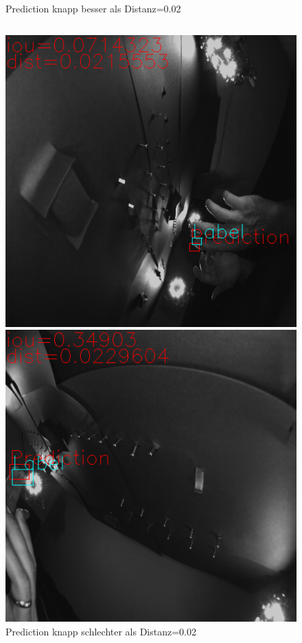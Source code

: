 \documentclass[a4paper,12pt]{article}
\begin{document}
\begin{figure}
\begin{minipage}[b]{0.48\textwidth}
	\end{minipage}
	\caption{Prediction knapp besser als Distanz=0.02}
	\label{img:distanz_knapp_gut}
	\begin{verbatim}
	\end{verbatim}
	\centering
	\begin{minipage}[b]{0.48\textwidth}	
		\includegraphics[width=\textwidth]{BilderResultate/3distKnappSchlecht.png}
	\end{minipage}
	\hfill
	\begin{minipage}[b]{0.48\textwidth}		
		\includegraphics[width=\textwidth]{BilderResultate/4distKnappSchlecht.png}
	\end{minipage}
	\caption{Prediction knapp schlechter als Distanz=0.02}	
	\label{img:distanz_knapp_schlecht}
\end{figure}
\end{document}
